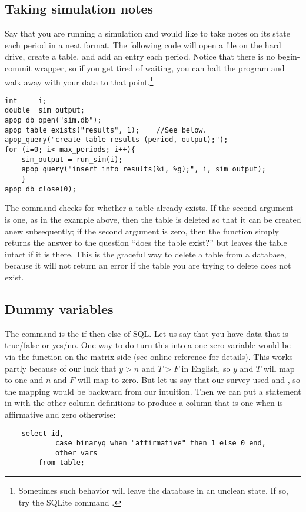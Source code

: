 \subsection{Taking simulation notes}\label{createeg}
Say that you are running a simulation and would like to take notes on
its state each period in a neat format. The following code will open a
file on the hard drive, create a table, and add an entry each period.
Notice that there is no begin-commit wrapper, so if you get tired of
waiting, you can halt the program and walk away with
your data to that point.\footnote{Sometimes such behavior will leave the database in
an unclean state. If so, try the SQLite command .}


\begin{lstlisting}
int     i;
double  sim_output;
apop_db_open("sim.db");
apop_table_exists("results", 1);    //See below.
apop_query("create table results (period, output);");
for (i=0; i< max_periods; i++){
    sim_output = run_sim(i);
    apop_query("insert into results(%i, %g);", i, sim_output);
    }
apop_db_close(0);
\end{lstlisting}

The  command checks for whether a table
already exists. If the second argument is one, as in the example above,
then the table is deleted so that it can be created anew subsequently;
if the second argument is zero, then the function simply returns the
answer to the question ``does the table exist?'' but leaves the table
intact if it is there. This is the graceful way to delete a table from
a database, because it will not return an error if the table you are
trying to delete does not exist.

\subsection{Dummy variables} 
The  command is the if-then-else of SQL. Let us say that you
have data that is true/false or yes/no. One way to do turn this into a
one-zero variable would be via
the  function on the matrix side
(see online reference for details). 
This works partly because of our
luck that $y > n$ and $T > F$ in English, so $y$ and $T$ will map to one
and $n$ and $F$ will map to zero. But let us say that our survey used
 and , so the mapping would be
backward from our intuition.  Then we can put a  statement in with the other
column definitions to produce a column that is one when
 is affirmative and zero otherwise:
\begin{lstlisting}
    select id, 
            case binaryq when "affirmative" then 1 else 0 end, 
            other_vars
        from table;
\end{lstlisting}

